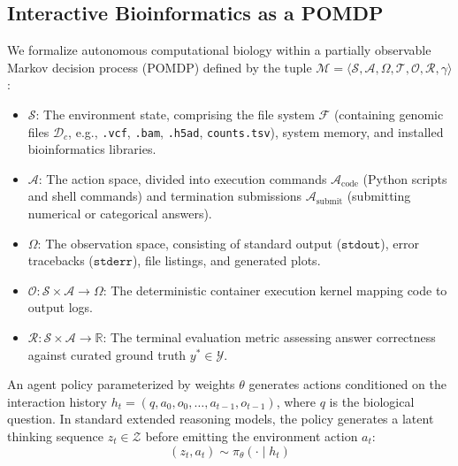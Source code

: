 \documentclass[11pt,letterpaper]{article}
\begin{document}
\subsection{Interactive Bioinformatics as a POMDP}
We formalize autonomous computational biology within a partially observable Markov decision process (POMDP) defined by the tuple $\mathcal{M} = \langle \mathcal{S}, \mathcal{A}, \Omega, \mathcal{T}, \mathcal{O}, \mathcal{R}, \gamma \rangle$:
\begin{itemize}
    \item $\mathcal{S}$: The environment state, comprising the file system $\mathcal{F}$ (containing genomic files $\mathcal{D}_c$, e.g., \texttt{.vcf}, \texttt{.bam}, \texttt{.h5ad}, \texttt{counts.tsv}), system memory, and installed bioinformatics libraries.
    \item $\mathcal{A}$: The action space, divided into execution commands $\mathcal{A}_{\text{code}}$ (Python scripts and shell commands) and termination submissions $\mathcal{A}_{\text{submit}}$ (submitting numerical or categorical answers).
    \item $\Omega$: The observation space, consisting of standard output ($\texttt{stdout}$), error tracebacks ($\texttt{stderr}$), file listings, and generated plots.
    \item $\mathcal{O}: \mathcal{S} \times \mathcal{A} \to \Omega$: The deterministic container execution kernel mapping code to output logs.
    \item $\mathcal{R}: \mathcal{S} \times \mathcal{A} \to \mathbb{R}$: The terminal evaluation metric assessing answer correctness against curated ground truth $y^* \in \mathcal{Y}$.
\end{itemize}

An agent policy parameterized by weights $\theta$ generates actions conditioned on the interaction history $h_t = (q, a_0, o_0, \dots, a_{t-1}, o_{t-1})$, where $q$ is the biological question. In standard extended reasoning models, the policy generates a latent thinking sequence $z_t \in \mathcal{Z}$ before emitting the environment action $a_t$:
\begin{equation}
(z_t, a_t) \sim \pi_\theta(\cdot \mid h_t)
\end{equation}
\end{document}
